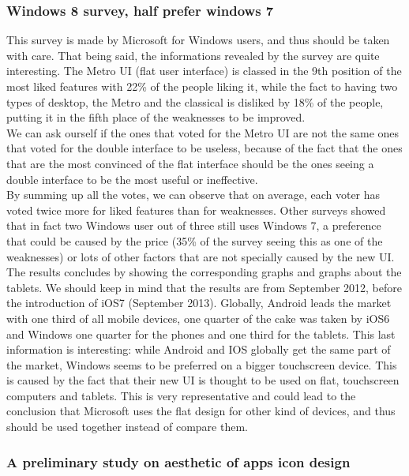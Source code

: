 \documentclass[a4paper,11pt] {article}
\theoremstyle{definition}
\begin{document}
    \subsubsection{Windows 8 survey, half prefer windows 7\cite{windows8Survey}}
    This survey is made by Microsoft for Windows users, and thus should be taken with care. That being said, the informations revealed by the survey are quite interesting. The Metro UI (flat user interface) is classed in the 9th position of the most liked features with 22\% of the people liking it, while the fact to having two types of desktop, the Metro and the classical is disliked by 18\% of the people, putting it in the fifth place of the weaknesses to be improved.\\

    We can ask ourself if the ones that voted for the Metro UI are not the same ones that voted for the double interface to be useless, because of the fact that the ones that are the most convinced of the flat interface should be the ones seeing a double interface to be the most useful or ineffective.\\

    By summing up all the votes, we can observe that on average, each voter has voted twice more for liked features than for weaknesses. Other surveys showed that in fact two Windows user out of three still uses Windows 7, a preference that could be caused by the price (35\% of the survey seeing this as one of the weaknesses) or lots of other factors that are not specially caused by the new UI.\\

    The results concludes by showing the corresponding graphs and graphs about the tablets. We should keep in mind that the results are from September 2012, before the introduction of iOS7 (September 2013). Globally, Android leads the market with one third of all mobile devices, one quarter of the cake was taken by iOS6 and Windows one quarter for the phones and one third for the tablets. This last information is interesting: while Android and IOS globally get the same part of the market, Windows seems to be preferred on a bigger touchscreen device. This is caused by the fact that their new UI is thought to be used on flat, touchscreen computers and tablets. This is very representative and could lead to the conclusion that Microsoft uses the flat design for other kind of devices, and thus should be used together instead of compare them.

    \subsubsection{A preliminary study on aesthetic of apps icon design}
\end{document}

